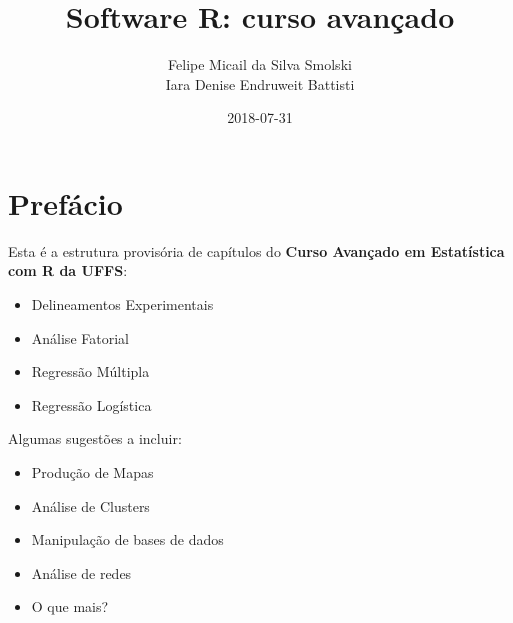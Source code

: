 \documentclass[12pt,brazil,]{book}
\title{Software R: curso avançado}
\author{Felipe Micail da Silva Smolski \\ Iara Denise Endruweit Battisti}
\date{2018-07-31}
\providecommand{\tightlist}{%
  \setlength{\itemsep}{0pt}\setlength{\parskip}{0pt}}
\begin{document}
\maketitle

{
\setcounter{tocdepth}{1}
\tableofcontents
}
\hypertarget{prefacio}{%
\chapter*{Prefácio}\label{prefacio}}

Esta é a estrutura provisória de capítulos do \textbf{Curso Avançado em
Estatística com R da UFFS}:

\begin{itemize}
\tightlist
\item
  Delineamentos Experimentais
\item
  Análise Fatorial
\item
  Regressão Múltipla
\item
  Regressão Logística
\end{itemize}

Algumas sugestões a incluir:

\begin{itemize}
\tightlist
\item
  Produção de Mapas
\item
  Análise de Clusters
\item
  Manipulação de bases de dados
\item
  Análise de redes
\item
  O que mais?
\end{itemize}
\end{document}
